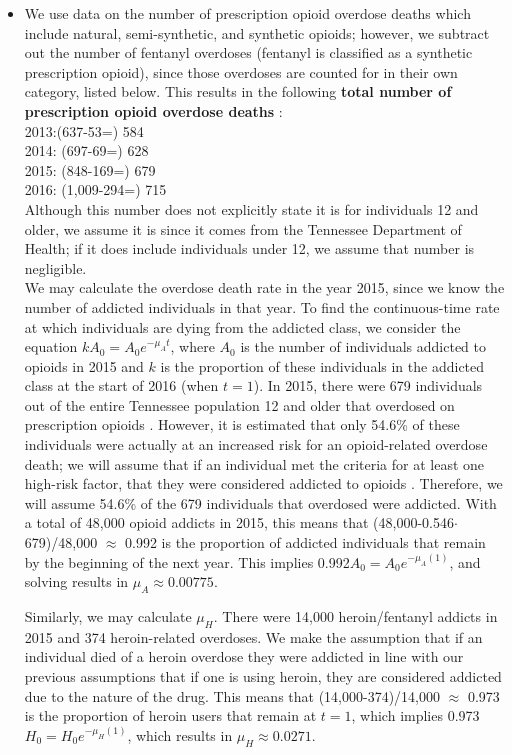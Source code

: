 \documentclass[12pt]{article}
\begin{document}
\begin{itemize}

\item We use data on the number of prescription opioid overdose deaths which include natural, semi-synthetic, and synthetic opioids; however, we subtract out the number of fentanyl overdoses (fentanyl is classified as a synthetic prescription opioid), since those overdoses are counted for in their own category, listed below. This results in the following  \textbf{total number of prescription opioid overdose deaths} \cite{PDO}: \\
2013:(637-53=) 584 \\
2014: (697-69=) 628 \\
2015: (848-169=) 679 \\
2016: (1,009-294=) 715 \\

Although this number does not explicitly state it is for individuals 12 and older, we assume it is since it comes from the Tennessee Department of Health; if it does include individuals under 12, we assume that number is negligible. \\

We may calculate the overdose death rate in the year 2015, since we know the number of addicted individuals in that year. To find the continuous-time rate at which individuals are dying from the addicted class, we consider the equation $k A_{0}=A_{0}e^{-\mu_{A}t}$, where $A_0$ is the number of individuals addicted to opioids in 2015 and $k$ is the proportion of these individuals in the addicted class at the start of 2016 (when $t=1$). In 2015, there were 679 individuals out of the entire Tennessee population 12 and older that overdosed on prescription opioids \cite{PDO}. However, it is estimated that only 54.6\% of these individuals were actually at an increased risk for an opioid-related overdose death; we will assume that if an individual met the criteria for at least one high-risk factor, that they were considered addicted to opioids \cite{Gwira}. Therefore, we will assume 54.6\% of the 679 individuals that overdosed were addicted. With a total of 48,000 opioid addicts in 2015, this means that (48,000-0.546$\cdot$679)/48,000 $\approx$ 0.992 is the proportion of addicted individuals that remain by the beginning of the next year. This implies 0.992$A_0=A_0 e^{-\mu_{A}(1)}$, and solving results in $\mu_{A} \approx 0.00775.$

Similarly, we may calculate $\mu_{H}$. There were 14,000 heroin/fentanyl addicts in 2015 and 374 heroin-related overdoses. We make the assumption that if an individual died of a heroin overdose they were addicted in line with our previous assumptions that if one is using heroin, they are considered addicted due to the nature of the drug. This means that (14,000-374)/14,000 $\approx$ 0.973 is the proportion of heroin users that remain at $t=1$, which implies 0.973$H_0=H_0 e^{-\mu_{H}(1)}$, which results in $\mu_{H} \approx 0.0271.$




\end{itemize}
\end{document}
